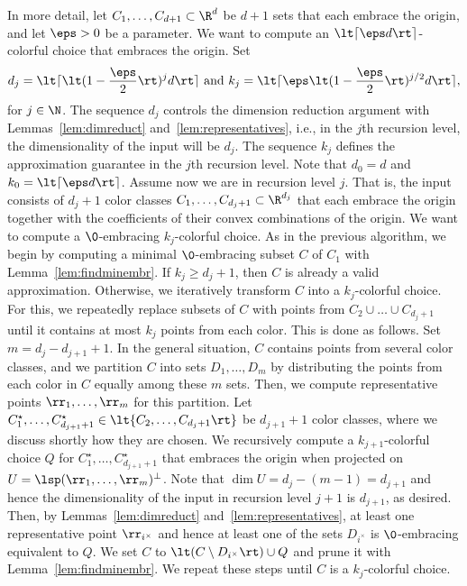 In more detail, let $C_1,\dots,C_{d+1}\subset\R^d$ be $d+1$ sets that each
embrace the origin, and let $\eps > 0$ be a parameter. We want to compute 
an $\lt\lceil \eps d\rt\rceil$-colorful choice that embraces the origin. 
Set
\[
d_j = \lt\lceil \lt(1-\frac{\eps}{2}\rt)^j d \rt\rceil \text{~and }
k_j = \lt\lceil \eps \lt(1-\frac{\eps}{2}\rt)^{j/2}
d\rt\rceil,
\]
for $j \in \N$. The sequence $d_j$ controls the dimension reduction
argument with Lemmas~\ref{lem:dimreduct} and~\ref{lem:representatives}, 
i.e., in the $j$th recursion level, the dimensionality of the input 
will be $d_j$. The sequence $k_j$ defines the approximation guarantee 
in the $j$th recursion level.  Note that $d_0 = d$ and 
$k_0 = \lt\lceil \eps d \rt\rceil$. Assume now we are in recursion 
level $j$. That is, the input consists of $d_j+1$
color classes $C_1,\dots,C_{d_j+1} \subset \R^{d_j}$ that each embrace the
origin together with the coefficients of their convex combinations 
of the origin.
We want to compute a $\0$-embracing $k_j$-colorful choice.
As in the previous algorithm, we begin by computing a minimal 
$\0$-embracing subset $C$ of $C_1$ with Lemma~\ref{lem:findminembr}. 
If $k_j \geq d_j + 1$, then $C$ is already a valid approximation. 
Otherwise, we iteratively transform $C$ into a $k_j$-colorful choice. 
For this, we repeatedly replace subsets
of $C$ with points from $C_2 \cup \dots \cup C_{d_j + 1}$
until it contains at most $k_j$ points from each color. This 
is done as follows. Set $m = d_j - d_{j+1} + 1$. 
In the general situation, $C$ contains points from several
color classes, and we partition $C$ into sets $D_1,\dots,D_m$ by
distributing the points from each color in $C$ equally among 
these $m$ sets. Then,
we compute representative points $\rr_1,\dots,\rr_m$ for this partition. 
Let
$C^\star_1,\dots,C^\star_{d_{j+1}+1} \in \lt\{C_2,\dots,C_{d_j+1}\rt\}$ be
$d_{j+1}+1$ color classes, where we discuss shortly how they are chosen.
We recursively compute a $k_{j+1}$-colorful choice $Q$ for
$C^\star_1,\dots,C^\star_{d_{j+1}+1}$ that embraces the
origin when projected on $U = \lsp(\rr_1,\dots,\rr_m)^\perp$. 
Note that $\dim U = d_j-(m-1) = d_{j+1}$
and hence the dimensionality of the input in recursion level 
$j+1$ is $d_{j+1}$, as desired. Then, by Lemmas~\ref{lem:dimreduct}
and~\ref{lem:representatives}, at least one representative 
point $\rr_{i^\times}$ and
hence at least one of the sets $D_{i^\times}$ is
$\0$-embracing equivalent to $Q$. We set $C$ to $\lt(C \setminus
D_{i^\times}\rt) \cup Q$ and prune it with Lemma~\ref{lem:findminembr}. 
We repeat these steps until $C$ is a $k_j$-colorful choice. 

